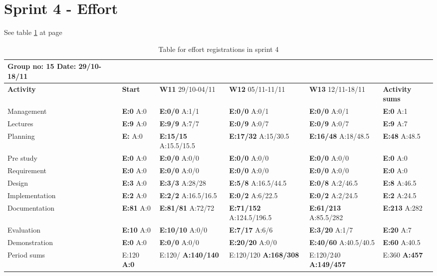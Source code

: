 \section{Sprint 4 - Effort}

See table \ref{tab:effortweekss4} at page \pageref{tab:effortweekss4}

\begin{table}[htb]
\begin{tabularx}{\linewidth}{>{\setlength\hsize{.625\hsize}}X|>{\setlength\hsize{0.3\hsize}}X|>{\setlength\hsize{0.5\hsize}}X|>{\setlength\hsize{0.5\hsize}}X|>{\setlength\hsize{0.5\hsize}}X|>{\setlength\hsize{.3\hsize}}X}
Group no: 15 Date: 29/10-18/11  \\ \hline
\textbf{Activity} & \textbf{Start} & \textbf{W11} 29/10-04/11 & \textbf{W12} 05/11-11/11 & \textbf{W13} 12/11-18/11 & \textbf{Activity sums} \\ \hline \hline
Management & \textbf{E:0} A:0 & \textbf{E:0/0} A:1/1 & \textbf{E:0/0} A:0/1 & \textbf{E:0/0} A:0/1 & \textbf{E:0} A:1  \\ \hline
Lectures & \textbf{E:9} A:0 & \textbf{E:9/9} A:7/7 & \textbf{E:0/9} A:0/7 & \textbf{E:0/9} A:0/7 & \textbf{E:9} A:7  \\ \hline
Planning & \textbf{E:} A:0 & \textbf{E:15/15} A:15.5/15.5 & \textbf{E:17/32} A:15/30.5 & \textbf{E:16/48} A:18/48.5 & \textbf{E:48} A:48.5  \\ \hline
Pre study & \textbf{E:0} A:0 & \textbf{E:0/0} A:0/0 & \textbf{E:0/0} A:0/0 & \textbf{E:0/0} A:0/0 & \textbf{E:0} A:0  \\ \hline
Requirement & \textbf{E:0} A:0 & \textbf{E:0/0} A:0/0 & \textbf{E:0/0} A:0/0 & \textbf{E:0/0} A:0/0 & \textbf{E:0} A:0 \\ \hline
Design & \textbf{E:3} A:0 & \textbf{E:3/3} A:28/28 & \textbf{E:5/8} A:16.5/44.5 & \textbf{E:0/8} A:2/46.5 & \textbf{E:8} A:46.5  \\ \hline
Implementation & \textbf{E:2} A:0 & \textbf{E:2/2} A:16.5/16.5 & \textbf{E:0/2} A:6/22.5 & \textbf{E:0/2} A:2/24.5 & \textbf{E:2} A:24.5  \\ \hline
Documentation & \textbf{E:81} A:0 & \textbf{E:81/81} A:72/72 & \textbf{E:71/152} A:124.5/196.5 & \textbf{E:61/213} A:85.5/282 & \textbf{E:213} A:282  \\ \hline
Evaluation & \textbf{E:10} A:0 & \textbf{E:10/10} A:0/0 & \textbf{E:7/17} A:6/6 & \textbf{E:3/20} A:1/7 & \textbf{E:20 } A:7  \\ \hline
Demonstration & \textbf{E:0} A:0 & \textbf{E:0/0} A:0/0 & \textbf{E:20/20} A:0/0 & \textbf{E:40/60} A:40.5/40.5 & \textbf{E:60 } A:40.5  \\ \hline
Period sums & E:120 \textbf{A:0} & E:120/ \textbf{A:140/140} & E:120/120 \textbf{A:168/308} & E:120/240 \textbf{A:149/457} & E:360 \textbf{A:457} \\ \hline
\end{tabularx}

\caption{Table for effort registrations in sprint 4} \label{tab:effortweekss4}
\end{table}


